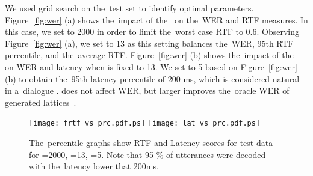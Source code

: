 We used grid search on the~test set to identify optimal parameters.
Figure~\ref{fig:wer} (a) shows the~impact of the~ on the~WER and RTF measures.
In this case, we set  to 2000 in order to limit the~worst case RTF to 0.6.
Observing Figure~\ref{fig:wer} (a), we set  to 13 as this setting balances the~WER, 95th RTF percentile, and the~average RTF.
Figure~\ref{fig:wer} (b) shows the~impact of the~ on WER and latency when  is fixed to 13.
We set  to 5 based on Figure~\ref{fig:wer} (b) to obtain the~95th latency percentile of 200 ms, which is considered natural in a~dialogue \cite{skantze2009incremental}.
 does not affect WER, but larger  improves the~oracle WER of generated lattices~\cite{povey2012generating}.

\begin{figure*}[t]
    \begin{center}
    \texttt{[image: frtf\_vs\_prc.pdf.ps]}
    \texttt{[image: lat\_vs\_prc.pdf.ps]}
    \caption{The~percentile graphs show RTF and Latency scores for test data for =2000, =13, =5.
Note that 95 \% of utterances were decoded with the~latency lower that 200ms.}
    \label{fig:prc}
    \end{center}
\end{figure*}



